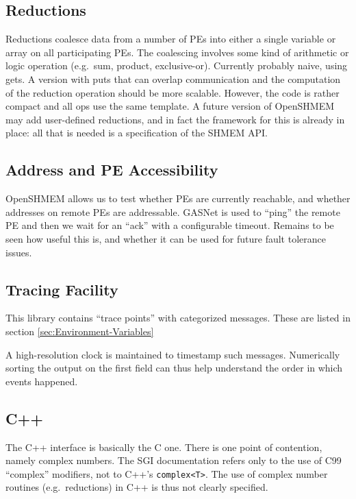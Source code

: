 \documentclass[english]{article}
\begin{document}
\subsection{Reductions}

Reductions coalesce data from a number of PEs into either a single
variable or array on all participating PEs. The coalescing involves
some kind of arithmetic or logic operation (e.g.\ sum, product,
exclusive-or).  Currently probably naive, using gets. A version with
puts that can overlap communication and the computation of the
reduction operation should be more scalable. However, the code is
rather compact and all ops use the same template. A future version of
OpenSHMEM may add user-defined reductions, and in fact the framework
for this is already in place: all that is needed is a specification of
the SHMEM API.

\subsection{Address and PE Accessibility}

OpenSHMEM allows us to test whether PEs are currently reachable, and
whether addresses on remote PEs are addressable. GASNet is used to
``ping'' the remote PE and then we wait for an ``ack'' with a
configurable timeout. Remains to be seen how useful this is, and
whether it can be used for future fault tolerance issues.

\subsection{Tracing Facility}

This library contains \textquotedblleft{}trace
points\textquotedblright{} with categorized messages. These are listed
in section \ref{sec:Environment-Variables}

A high-resolution clock is maintained to timestamp such messages.
Numerically sorting the output on the first field can thus help
understand the order in which events happened.

\subsection{C++}

The C++ interface is basically the C one. There is one point of
contention, namely complex numbers. The SGI documentation refers only
to the use of C99 ``complex'' modifiers, not to C++'s
\texttt{complex<T>}.  The use of complex number routines (e.g.\
reductions) in C++ is thus not clearly specified.
\end{document}
